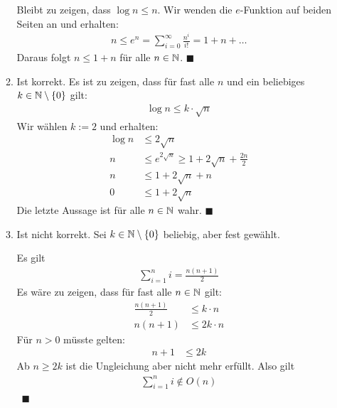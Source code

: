 \begin{enumerate}
\begin{enumerate}
        Bleibt zu zeigen, dass $\log n \leq n$.
        Wir wenden die $e$-Funktion auf beiden Seiten an und erhalten:
        \begin{align*}
          n \leq e^n = \sum\limits_{i=0}^{\infty} \frac{n^i}{i!} = 1 + n + \dots
        \end{align*}
        Daraus folgt $n \leq 1 + n$ für alle $n \in \mathbb{N}$. \hfill $\blacksquare$

      \item Ist korrekt. Es ist zu zeigen, dass für fast alle $n$ und ein
        beliebiges $k \in \mathbb{N} \setminus \{ 0 \}$ gilt:
        \begin{align*}
          \log n \leq k \cdot \sqrt{n}
        \end{align*}
        Wir wählen $k := 2$ und erhalten:
        \begin{align*}
          \log n & \leq 2 \sqrt{n}\\
          n & \leq e^{2 \sqrt{n}} \geq 1 + 2 \sqrt{n} + \frac{2 n}{2}\\
          n & \leq 1 + 2 \sqrt{n} + n\\
          0 & \leq 1 + 2 \sqrt{n}
        \end{align*}
        Die letzte Aussage ist für alle $n \in \mathbb{N}$ wahr. \hfill $\blacksquare$

      \item Ist nicht korrekt. Sei $k \in \mathbb{N} \setminus \{ 0 \}$ beliebig, aber
        fest gewählt.

        Es gilt
        \begin{align*}
          \sum\limits_{i = 1}^{n} i = \frac{n(n+1)}{2}
        \end{align*}
        Es wäre zu zeigen, dass für fast alle $n \in \mathbb{N}$ gilt:
        \begin{align*}
          \frac{n(n+1)}{2} & \leq k \cdot n\\
          n(n+1) & \leq 2k \cdot n
        \end{align*}
        Für $n > 0$ müsste gelten:
        \begin{align*}
          n+1 & \leq 2k
        \end{align*}
        Ab $n \geq 2k$ ist die Ungleichung aber nicht mehr erfüllt. Also gilt
        \begin{align*}
          \sum\limits_{i = 1}^{n} i \notin O(n)
        \end{align*}
        \ \hfill $\blacksquare$
    \end{enumerate}


\end{enumerate}
